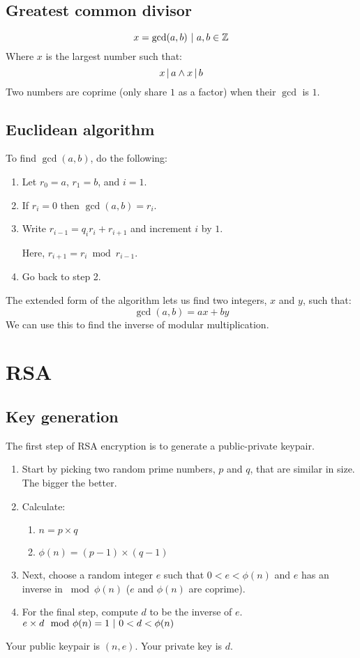 		\subsection*{Greatest common divisor}
			\[x = \gcd(a, b) \ |\  a, b \in \mathbb{Z}\]
			Where $x$ is the largest number such that:
			\[x \operatorname{|} a \wedge x \operatorname{|} b\]
			Two numbers are coprime (only share $1$ as a factor) when their $\gcd$ is $1$.
		\subsection*{Euclidean algorithm}
			To find $\gcd(a, b)$, do the following:
			\begin{enumerate}
				\item Let $r_0 = a$, $r_1 = b$, and $i = 1$.
				\item If $r_i = 0$ then $\gcd(a, b) = r_i$.
				\item Write $r_{i-1} = q_ir_i + r_{i+1}$ and increment $i$ by $1$.
				
				      Here, $r_{i+1} = r_i \bmod r_{i-1}$.
				\item Go back to step 2.
			\end{enumerate}
			The extended form of the algorithm lets us find two integers, $x$ and $y$, such that:
			\[\gcd(a,b) = ax + by\]
			We can use this to find the inverse of modular multiplication.
	\section*{RSA}
		\subsection*{Key generation}
			The first step of RSA encryption is to generate a public-private keypair.
			\begin{enumerate}
				\item Start by picking two random prime numbers, $p$ and $q$, that are similar in size. The bigger the better.
				\item Calculate:
					\begin{enumerate}
						\item $n = p \times q$
						\item $\phi(n) = (p - 1) \times (q - 1)$
					\end{enumerate}
				\item Next, choose a random integer $e$ such that $0 < e < \phi(n)$ and $e$ has an inverse in $\bmod \phi(n)$ ($e$ and $\phi(n)$ are coprime).
				\item For the final step, compute $d$ to be the inverse of $e$. $e \times d \mod \phi(n) = 1 \ |\  0 < d < \phi(n)$
			\end{enumerate}
			Your public keypair is $(n, e)$. Your private key is $d$.
